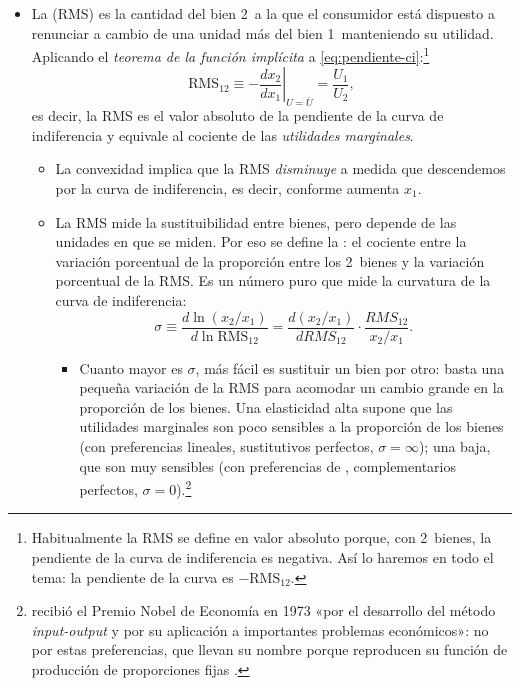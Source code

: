 \documentclass[11pt]{article}
\begin{document}
\begin{itemize}
\item La  (RMS) es la cantidad del bien 2~a la que el consumidor está dispuesto a renunciar a cambio de una unidad más del bien 1~manteniendo su utilidad. Aplicando el \emph{teorema de la función implícita} a \eqref{eq:pendiente-ci}:\footnote{Habitualmente la RMS se define en valor absoluto porque, con 2~bienes, la pendiente de la curva de indiferencia es negativa. Así lo haremos en todo el tema: la pendiente de la curva es $-\mathrm{RMS}_{12}$.}
  \begin{equation}
  \mathrm{RMS}_{12}\equiv-\left.\frac{dx_2}{dx_1}\right|_{U=\overline{U}}=\frac{U_1}{U_2}, \label{eq:rms}
  \end{equation}
  es decir, la RMS es el valor absoluto de la pendiente de la curva de indiferencia y equivale al cociente de las \emph{utilidades marginales}.
  \begin{itemize}
  \item La convexidad implica que la RMS \emph{disminuye} a medida que descendemos por la curva de indiferencia, es decir, conforme aumenta $x_1$.
  \item La RMS mide la sustituibilidad entre bienes, pero depende de las unidades en que se miden. Por eso se define la : el cociente entre la variación porcentual de la proporción entre los 2~bienes y la variación porcentual de la RMS. Es un número puro que mide la curvatura de la curva de indiferencia:
    \begin{equation}
    \sigma\equiv\frac{d\ln(x_2/x_1)}{d\ln\mathrm{RMS}_{12}}=\frac{d(x_2/x_1)}{dRMS_{12}}\cdot\frac{RMS_{12}}{x_2/x_1}. \label{eq:elasticidad-sustitucion}
    \end{equation}
    \begin{itemize}
    \item Cuanto mayor es $\sigma$, más fácil es sustituir un bien por otro: basta una pequeña variación de la RMS para acomodar un cambio grande en la proporción de los bienes. Una elasticidad alta supone que las utilidades marginales son poco sensibles a la proporción de los bienes (con preferencias lineales, sustitutivos perfectos, $\sigma=\infty$); una baja, que son muy sensibles (con preferencias de , complementarios perfectos, $\sigma=0$).\footnote{ recibió el Premio Nobel de Economía en 1973 «por el desarrollo del método \emph{input-output} y por su aplicación a importantes problemas económicos»\nocite{Nobel1973Leontief}: no por estas preferencias, que llevan su nombre porque reproducen su función de producción de proporciones fijas .}

\end{itemize}
\end{itemize}
\end{itemize}
\end{document}
